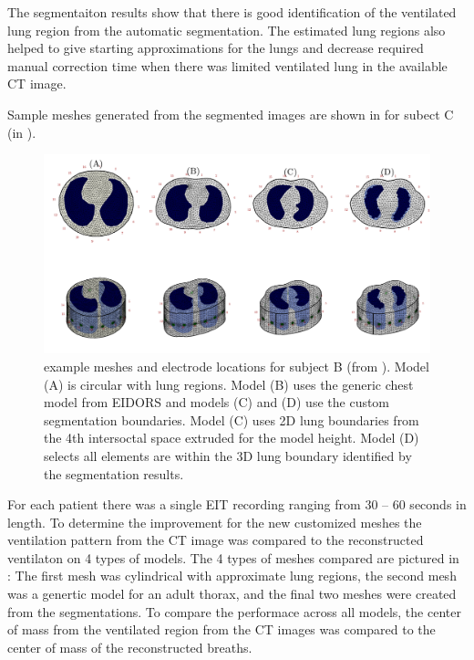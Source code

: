 The segmentaiton results show that there is good identification of the
ventilated lung region from the automatic segmentation. The estimated lung regions also helped to 
give starting approximations for the lungs and decrease required manual 
correction time when there was limited ventilated lung in the available CT image.

Sample meshes generated from the segmented images are shown in  
for subect C (in ).

\begin{figure}
	\centering
	\includegraphics[width=\textwidth]{chapter5-CT_to_mesh/imgs/fem_models_PT04.pdf}
	\caption[]{\label{fig:fem-results}%
	example meshes and electrode locations for subject B (from ).
	Model (A) is circular with lung regions. Model (B) uses the generic chest model from EIDORS 
	and models (C) and (D) use the custom segmentation boundaries. Model (C) uses 2D lung boundaries 
	from the 4th intersoctal space extruded for the model height. Model (D) selects all elements
	are within the 3D lung boundary identified by the segmentation results.
	}
\end{figure}

For each patient there was a single EIT recording ranging from 30 -- 60 seconds in length.
To determine the improvement for the new customized meshes the ventilation pattern 
from the CT image was compared to the reconstructed ventilaton on 4 types of models.
The 4 types of meshes compared are pictured in : The first mesh was
cylindrical with approximate lung regions, the second mesh was a genertic model 
for an adult thorax, and the final two meshes were created from the segmentations. 
To compare the performace across all models, the center of mass from the 
ventilated region from the CT images was compared to the center of mass of the reconstructed 
breaths.




